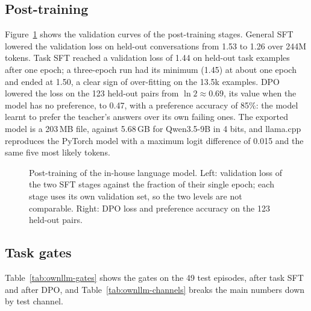 \subsection*{Post-training}

Figure~\ref{fig:posttrain} shows the validation curves of the post-training stages. General SFT lowered the validation loss on held-out conversations from 1.53 to 1.26 over 244M tokens. Task SFT reached a validation loss of 1.44 on held-out task examples after one epoch; a three-epoch run had its minimum (1.45) at about one epoch and ended at 1.50, a clear sign of over-fitting on the 13.5k examples. DPO lowered the loss on the 123 held-out pairs from $\ln 2 \approx 0.69$, its value when the model has no preference, to 0.47, with a preference accuracy of 85\%: the model learnt to prefer the teacher's answers over its own failing ones. The exported model is a 203\,MB file, against 5.68\,GB for Qwen3.5-9B in 4 bits, and llama.cpp reproduces the PyTorch model with a maximum logit difference of 0.015 and the same five most likely tokens.

\begin{figure}[H]
\centering
\begin{minipage}{0.48\textwidth}
\centering
{}
\end{minipage}\hfill
\begin{minipage}{0.48\textwidth}
\centering
{}
\end{minipage}
\caption{Post-training of the in-house language model. Left: validation loss of the two SFT stages against the fraction of their single epoch; each stage uses its own validation set, so the two levels are not comparable. Right: DPO loss and preference accuracy on the 123 held-out pairs.}
\label{fig:posttrain}
\end{figure}

\subsection*{Task gates}

Table~\ref{tab:ownllm-gates} shows the gates on the 49 test episodes, after task SFT and after DPO, and Table~\ref{tab:ownllm-channels} breaks the main numbers down by test channel.

